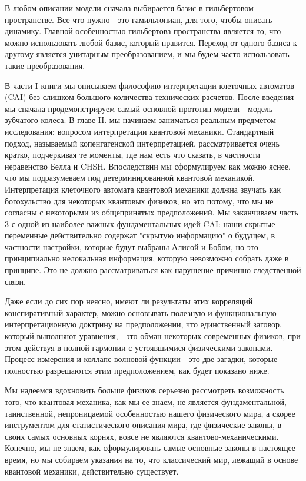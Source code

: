 \documentclass[main.tex]{subfiles}
\begin{document}
В любом описании модели сначала выбирается базис в гильбертовом пространстве. Все что нужно - это гамильтониан, для того, чтобы описать динамику. Главной особенностью гильбертова пространства является то, что можно использовать любой базис, который нравится. Переход от одного базиса к другому является унитарным преобразованием, и мы будем часто использовать такие преобразования. 

В части I книги мы описываем философию интерпретации клеточных автоматов (CAI) без слишком большого количества технических расчетов. После введения мы сначала продемонстрируем самый основной прототип модели - модель зубчатого колеса. В главе II. мы начинаем заниматься реальным предметом исследования: вопросом интерпретации квантовой механики. Стандартный подход, называемый копенгагенской интерпретацией, рассматривается очень кратко, подчеркивая те моменты, где нам есть что сказать, в частности неравенство Белла и CHSH. Впоследствии мы сформулируем как можно яснее, что мы подразумеваем под детерминированной квантовой механикой. Интерпретация клеточного автомата квантовой механики должна звучать как богохульство для некоторых квантовых физиков, но это потому, что мы не согласны с некоторыми из общепринятых предположений. Мы заканчиваем часть 3 с одной из наиболее важных фундаментальных идей CAI: наши скрытые переменные действительно содержат "скрытую информацию" о будущем, в частности настройки, которые будут выбраны Алисой и Бобом, но это принципиально нелокальная информация, которую невозможно собрать даже в принципе. Это не должно рассматриваться как нарушение причинно-следственной связи. 

Даже если до сих пор неясно, имеют ли результаты этих корреляций конспиративный характер, можно основывать полезную и функциональную интерпретационную доктрину на предположении, что единственный заговор, который выполняют уравнения, - это обман некоторых современных физиков, при этом действуя в полной гармонии с устоявшимися физическими законами. Процесс измерения и коллапс волновой функции - это две загадки, которые полностью разрешаются этим предположением, как будет показано ниже. 

Мы надеемся вдохновить больше физиков серьезно рассмотреть возможность того, что квантовая механика, как мы ее знаем, не является фундаментальной, таинственной, непроницаемой особенностью нашего физического мира, а скорее инструментом для статистического описания мира, где физические законы, в своих самых основных корнях, вовсе не являются квантово-механическими. Конечно, мы не знаем, как сформулировать самые основные законы в настоящее время, но мы собираем указания на то, что классический мир, лежащий в основе квантовой механики, действительно существует. 
\end{document}

